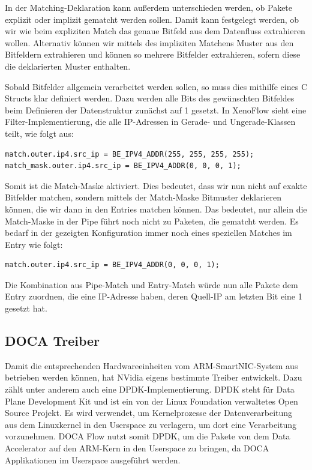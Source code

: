 In der Matching-Deklaration kann außerdem unterschieden werden, ob Pakete explizit oder implizit gematcht werden sollen. Damit kann festgelegt werden, ob wir wie beim expliziten Match das genaue Bitfeld aus dem Datenfluss extrahieren wollen. Alternativ können wir mittels des impliziten Matchens Muster aus den Bitfeldern extrahieren und können so mehrere Bitfelder extrahieren, sofern diese die deklarierten Muster enthalten.

Sobald Bitfelder allgemein verarbeitet werden sollen, so muss dies mithilfe eines C Structs klar definiert werden. Dazu werden alle Bits des gewünschten Bitfeldes beim Definieren der Datenstruktur zunächst auf 1 gesetzt.
In XenoFlow sieht eine Filter-Implementierung, die alle IP-Adressen in Gerade- und Ungerade-Klassen teilt, wie folgt aus:
\begin{verbatim}
match.outer.ip4.src_ip = BE_IPV4_ADDR(255, 255, 255, 255);
match_mask.outer.ip4.src_ip = BE_IPV4_ADDR(0, 0, 0, 1);
\end{verbatim}
Somit ist die Match-Maske aktiviert. Dies bedeutet, dass wir nun nicht auf exakte Bitfelder matchen, sondern mittels der Match-Maske Bitmuster deklarieren können, die wir dann in den Entries matchen können. Das bedeutet, nur allein die Match-Maske in der Pipe führt noch nicht zu Paketen, die gematcht werden. Es bedarf in der gezeigten Konfiguration immer noch eines speziellen Matches im Entry wie folgt: 
\begin{verbatim}
match.outer.ip4.src_ip = BE_IPV4_ADDR(0, 0, 0, 1);
\end{verbatim}
Die Kombination aus Pipe-Match und Entry-Match würde nun alle Pakete dem Entry zuordnen, die eine IP-Adresse haben, deren Quell-IP am letzten Bit eine 1 gesetzt hat.
\subsection{DOCA Treiber}
Damit die entsprechenden Hardwareeinheiten vom ARM-SmartNIC-System aus betrieben werden können, hat NVidia eigens bestimmte Treiber entwickelt. Dazu zählt unter anderem auch eine DPDK-Implementierung. DPDK steht für Data Plane Development Kit und ist ein von der Linux Foundation verwaltetes Open Source Projekt. Es wird verwendet, um Kernelprozesse der Datenverarbeitung aus dem Linuxkernel in den Userspace zu verlagern, um dort eine Verarbeitung vorzunehmen. DOCA Flow nutzt somit DPDK, um die Pakete von dem Data Accelerator auf den ARM-Kern in den Userspace zu bringen, da DOCA Applikationen im Userspace ausgeführt werden. 

